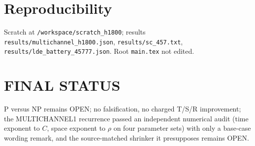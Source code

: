 \documentclass[11pt]{article}
\begin{document}
\section*{Reproducibility}
Scratch at \texttt{/workspace/scratch\_h1800}; results \texttt{results/multichannel\_h1800.json}, \texttt{results/sc\_457.txt}, \texttt{results/lde\_battery\_45777.json}. Root \texttt{main.tex} not edited.

\section*{FINAL STATUS}
P versus NP remains OPEN; no falsification, no charged T/S/R improvement; the MULTICHANNEL1 recurrence passed an independent numerical audit (time exponent to $C$, space exponent to $\rho$ on four parameter sets) with only a base-case wording remark, and the source-matched shrinker it presupposes remains OPEN.
\end{document}
